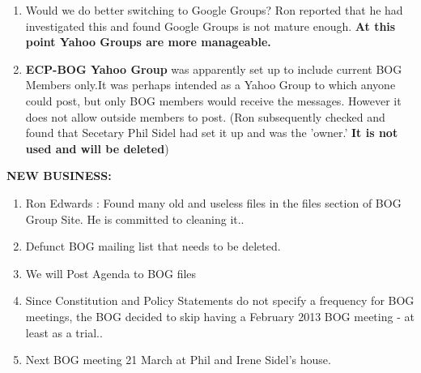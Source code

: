 \documentclass[10pt,a4paper]{article}
\begin{document}
\begin{multicols}{2}
\begin{enumerate}
\item Would we do better switching to Google Groups?  Ron reported that he had investigated this and found Google Groups is not mature enough. \textbf{At this point Yahoo Groups are more manageable.}  
\item \textbf{ECP-BOG Yahoo Group} was apparently set up to include current BOG Members only.It was perhaps intended as a Yahoo Group to which anyone could post, but only BOG members would receive the messages.  However it does not allow outside members to post.  (Ron subsequently checked and found that Secetary Phil Sidel had set it up and was the 'owner.'   \textbf{It is not used and will be deleted})
\end{enumerate}


\textbf{NEW BUSINESS:} \\
\begin{enumerate}
\item Ron Edwards :  Found many old and useless files in the files section of BOG Group Site.
He is committed to cleaning it.. 
\item Defunct BOG mailing list that needs to be deleted.
\item We will Post Agenda to BOG files
\item Since Constitution and Policy Statements do not specify a frequency for BOG meetings, the BOG decided to skip having a February 2013 BOG meeting - at least as a trial.. 
\item Next BOG meeting 21 March at Phil and Irene Sidel's house.

\end{enumerate}


\end{multicols}
\end{document}
